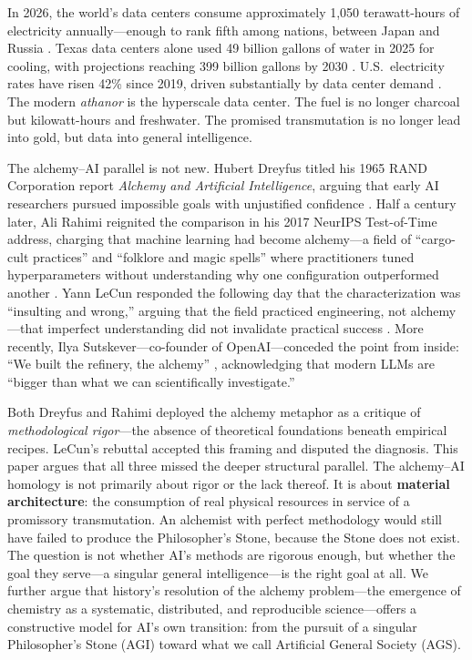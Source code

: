 \documentclass[12pt]{article}
\begin{document}
In 2026, the world's data centers consume approximately 1,050 terawatt-hours of electricity annually---enough to rank fifth among nations, between Japan and Russia \citep{iea2026}. Texas data centers alone used 49 billion gallons of water in 2025 for cooling, with projections reaching 399 billion gallons by 2030 \citep{harc2025}. U.S.\ electricity rates have risen 42\% since 2019, driven substantially by data center demand \citep{brookings2026}. The modern \emph{athanor} is the hyperscale data center. The fuel is no longer charcoal but kilowatt-hours and freshwater. The promised transmutation is no longer lead into gold, but data into general intelligence.

The alchemy--AI parallel is not new. Hubert Dreyfus titled his 1965 RAND Corporation report \emph{Alchemy and Artificial Intelligence}, arguing that early AI researchers pursued impossible goals with unjustified confidence \citep{dreyfus1965}. Half a century later, Ali Rahimi reignited the comparison in his 2017 NeurIPS Test-of-Time address, charging that machine learning had become alchemy---a field of ``cargo-cult practices'' and ``folklore and magic spells'' where practitioners tuned hyperparameters without understanding why one configuration outperformed another \citep{rahimi2017}. Yann LeCun responded the following day that the characterization was ``insulting and wrong,'' arguing that the field practiced engineering, not alchemy---that imperfect understanding did not invalidate practical success \citep{lecun2017}. More recently, Ilya Sutskever---co-founder of OpenAI---conceded the point from inside: ``We built the refinery, the alchemy'' \citep{sutskever2025}, acknowledging that modern LLMs are ``bigger than what we can scientifically investigate.''

Both Dreyfus and Rahimi deployed the alchemy metaphor as a critique of \emph{methodological rigor}---the absence of theoretical foundations beneath empirical recipes. LeCun's rebuttal accepted this framing and disputed the diagnosis. This paper argues that all three missed the deeper structural parallel. The alchemy--AI homology is not primarily about rigor or the lack thereof. It is about \textbf{material architecture}: the consumption of real physical resources in service of a promissory transmutation. An alchemist with perfect methodology would still have failed to produce the Philosopher's Stone, because the Stone does not exist. The question is not whether AI's methods are rigorous enough, but whether the goal they serve---a singular general intelligence---is the right goal at all. We further argue that history's resolution of the alchemy problem---the emergence of chemistry as a systematic, distributed, and reproducible science---offers a constructive model for AI's own transition: from the pursuit of a singular Philosopher's Stone (AGI) toward what we call Artificial General Society (AGS).
\end{document}
